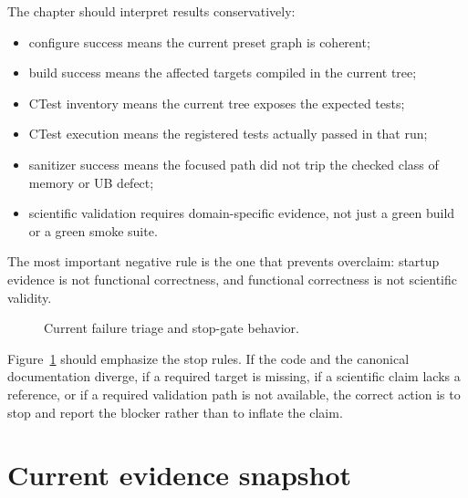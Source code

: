The chapter should interpret results conservatively:
\begin{itemize}
\item configure success means the current preset graph is coherent;
\item build success means the affected targets compiled in the current tree;
\item CTest inventory means the current tree exposes the expected tests;
\item CTest execution means the registered tests actually passed in that run;
\item sanitizer success means the focused path did not trip the checked class
of memory or UB defect;
\item scientific validation requires domain-specific evidence, not just a
green build or a green smoke suite.
\end{itemize}

The most important negative rule is the one that prevents overclaim:
startup evidence is not functional correctness, and functional correctness is
not scientific validity.

\begin{figure}[htbp]
\centering
\caption{Current failure triage and stop-gate behavior.}
\label{fig:failure-triage}
\end{figure}

Figure~\ref{fig:failure-triage} should emphasize the stop rules. If the code
and the canonical documentation diverge, if a required target is missing, if a
scientific claim lacks a reference, or if a required validation path is not
available, the correct action is to stop and report the blocker rather than to
inflate the claim.

\section{Current evidence snapshot}
\label{sec:test-evidence-snapshot}

